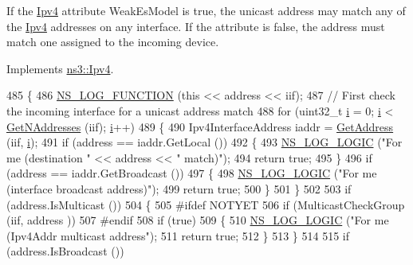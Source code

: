 If the \hyperlink{classns3_1_1Ipv4}{Ipv4} attribute Weak\+Es\+Model is true, the unicast address may match any of the \hyperlink{classns3_1_1Ipv4}{Ipv4} addresses on any interface. If the attribute is false, the address must match one assigned to the incoming device. 

Implements \hyperlink{classns3_1_1Ipv4_a82691b73bb7f96ca9932f5545b3d4d9c}{ns3\+::\+Ipv4}.


\begin{DoxyCode}
485 \{
486   \hyperlink{log-macros-disabled_8h_a90b90d5bad1f39cb1b64923ea94c0761}{NS\_LOG\_FUNCTION} (\textcolor{keyword}{this} << address << iif);
487   \textcolor{comment}{// First check the incoming interface for a unicast address match}
488   \textcolor{keywordflow}{for} (uint32\_t \hyperlink{bernuolliDistribution_8m_a6f6ccfcf58b31cb6412107d9d5281426}{i} = 0; \hyperlink{bernuolliDistribution_8m_a6f6ccfcf58b31cb6412107d9d5281426}{i} < \hyperlink{classns3_1_1Ipv4L3Protocol_ab816ec1b5f680117bc1363b3d9649b22}{GetNAddresses} (iif); \hyperlink{bernuolliDistribution_8m_a6f6ccfcf58b31cb6412107d9d5281426}{i}++)
489     \{
490       Ipv4InterfaceAddress iaddr = \hyperlink{classns3_1_1Ipv4L3Protocol_a85fa4287313a773dee29aa73fa74a7e0}{GetAddress} (iif, \hyperlink{bernuolliDistribution_8m_a6f6ccfcf58b31cb6412107d9d5281426}{i});
491       \textcolor{keywordflow}{if} (address == iaddr.GetLocal ())
492         \{
493           \hyperlink{group__logging_ga88acd260151caf2db9c0fc84997f45ce}{NS\_LOG\_LOGIC} (\textcolor{stringliteral}{"For me (destination "} << address << \textcolor{stringliteral}{" match)"});
494           \textcolor{keywordflow}{return} \textcolor{keyword}{true};
495         \}
496       \textcolor{keywordflow}{if} (address == iaddr.GetBroadcast ())
497         \{
498           \hyperlink{group__logging_ga88acd260151caf2db9c0fc84997f45ce}{NS\_LOG\_LOGIC} (\textcolor{stringliteral}{"For me (interface broadcast address)"});
499           \textcolor{keywordflow}{return} \textcolor{keyword}{true};
500         \}
501     \}
502 
503   \textcolor{keywordflow}{if} (address.IsMulticast ())
504     \{
505 \textcolor{preprocessor}{#ifdef NOTYET}
506       \textcolor{keywordflow}{if} (MulticastCheckGroup (iif, address ))
507 #endif
508       \textcolor{keywordflow}{if} (\textcolor{keyword}{true})
509         \{
510           \hyperlink{group__logging_ga88acd260151caf2db9c0fc84997f45ce}{NS\_LOG\_LOGIC} (\textcolor{stringliteral}{"For me (Ipv4Addr multicast address"});
511           \textcolor{keywordflow}{return} \textcolor{keyword}{true};
512         \}
513     \}
514 
515   \textcolor{keywordflow}{if} (address.IsBroadcast ())

\end{DoxyCode}
